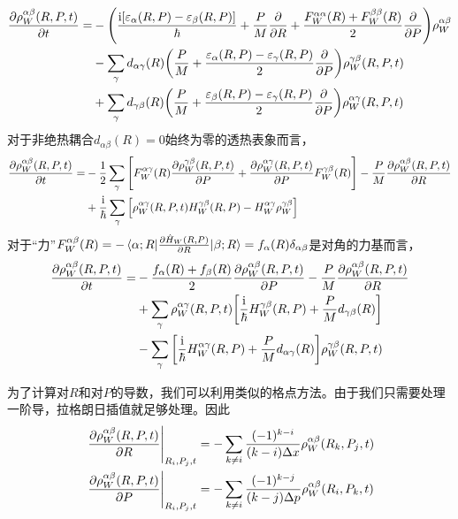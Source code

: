 \documentclass[UTF8,12pt]{article}
\begin{document}
        \begin{align}
            \pdv{\rho_W^{\alpha\beta}(R,P,t)}{t}=&-\qty( \frac{\mathrm{i}[\varepsilon_\alpha(R,P)-\varepsilon_\beta(R,P)]}{\hbar}+\frac{P}{M}\pdv{R}+\frac{F_W^{\alpha\alpha}(R)+F_W^{\beta\beta}(R)}{2}\pdv{P})\rho_W^{\alpha\beta} \nonumber \\
            &-\sum_{\gamma}{d_{\alpha\gamma}(R)\qty(\frac{P}{M}+\frac{\varepsilon_\alpha(R,P)-\varepsilon_{\gamma}(R,P)}{2}\pdv{P})\rho_W^{\gamma\beta}(R,P,t)} \nonumber \\
            &+\sum_{\gamma}{d_{\gamma\beta}(R)\qty(\frac{P}{M}+\frac{\varepsilon_\beta(R,P)-\varepsilon_{\gamma}(R,P)}{2}\pdv{P})\rho_W^{\alpha\gamma}(R,P,t)}
        \end{align}
        对于非绝热耦合$d_{\alpha\beta}(R)=0$始终为零的透热表象而言，
        \begin{align}
            \pdv{\rho_W^{\alpha\beta}(R,P,t)}{t}=&-\frac{1}{2}\sum_{\gamma}{\qty[F_W^{\alpha\gamma}(R)\pdv{\rho_W^{\gamma\beta}(R,P,t)}{P}+\pdv{\rho_W^{\alpha\gamma}(R,P,t)}{P}F_W^{\gamma\beta}(R)]}-\frac{P}{M}\pdv{\rho_W^{\alpha\beta}(R,P,t)}{R} \nonumber \\
            &+\frac{\mathrm{i}}{\hbar}\sum_{\gamma}{\qty[\rho_W^{\alpha\gamma}(R,P,t)H_W^{\gamma\beta}(R,P)-H_W^{\alpha\gamma}\rho_W^{\gamma\beta}]}
        \end{align}
        对于“力”$F_W^{\alpha\beta}(R)=-\mel{\alpha;R}{\pdv{\hat{H}_W(R,P)}{R}}{\beta;R}=f_\alpha(R)\delta_{\alpha\beta}$是对角的力基而言，
        \begin{align}
            \pdv{\rho_W^{\alpha\beta}(R,P,t)}{t}=&-\frac{f_\alpha(R)+f_\beta(R)}{2}\pdv{\rho_W^{\alpha\beta}(R,P,t)}{P}-\frac{P}{M}\pdv{\rho_W^{\alpha\beta}(R,P,t)}{R} \nonumber \\
            &+\sum_{\gamma}{\rho_W^{\alpha\gamma}(R,P,t)\qty[\frac{\mathrm{i}}{\hbar}H_W^{\gamma\beta}(R,P)+\frac{P}{M}d_{\gamma\beta}(R)]} \nonumber \\
            &-\sum_{\gamma}{\qty[\frac{\mathrm{i}}{\hbar}H_W^{\alpha\gamma}(R,P)+\frac{P}{M}d_{\alpha\gamma}(R)]\rho_W^{\gamma\beta}(R,P,t)}
        \end{align}\par
        为了计算对$R$和对$P$的导数，我们可以利用类似的格点方法。由于我们只需要处理一阶导，拉格朗日插值就足够处理。因此
        \begin{align}
            &\eval{\pdv{\rho^{\alpha\beta}_W(R,P,t)}{R}}_{R_i,P_j,t}=-\sum_{k\neq i}{\frac{(-1)^{k-i}}{(k-i)\Delta x}\rho^{\alpha\beta}_W(R_k,P_j,t)} \\
            &\eval{\pdv{\rho^{\alpha\beta}_W(R,P,t)}{P}}_{R_i,P_j,t}=-\sum_{k\neq i}{\frac{(-1)^{k-j}}{(k-j)\Delta p}\rho^{\alpha\beta}_W(R_i,P_k,t)}
        \end{align}
\end{document}
